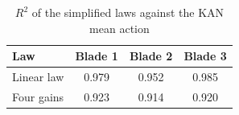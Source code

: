 \begin{table}[!t]
\centering
\caption{$R^2$ of the simplified laws against the KAN mean action}
\label{tab:lawfit}
\renewcommand{\arraystretch}{1.15}
\begin{tabular}{lccc}
\hline\hline
Law & Blade 1 & Blade 2 & Blade 3 \\
\hline
Linear law & 0.979 & 0.952 & 0.985 \\
Four gains & 0.923 & 0.914 & 0.920 \\
\hline\hline
\end{tabular}
\end{table}
